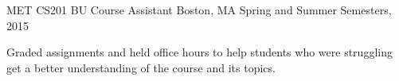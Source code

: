 \begin{cventries}

\cventry
{MET CS201} %
{BU Course Assistant} %
{Boston, MA} %
{Spring and Summer Semesters, 2015} %
{ %
\begin{cvitems}
\item {Graded assignments and held office hours to help students who were struggling get a better understanding of the course and its topics.}
\end{cvitems}
}


\end{cventries}
